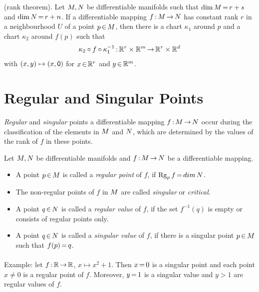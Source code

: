 \documentclass[11pt,twoside]{article}
\begin{document}
\begin{theorem} (rank theorem).
Let ${M},{N}$ be differentiable manifolds
such that
$\operatorname{dim} {M} {\,=\,} r+s$ and
$\operatorname{dim} {N} {\,=\,} r+n$.
If a differentiable mapping $f{\,:\,} {M} {\,\to\,} {N}$ has constant rank $r$
in a neighbourhood $U$ of a point $p {\,\in\,} {M}$,
then there is a chart $\kappa_1$ around $p$
and a chart $\kappa_2$ around $f(p)$
such that
\[
\kappa_2 \circ f \circ \kappa_1^{-1} {\,:\,}
{\mathbb{R}}^r \times {\mathbb{R}}^m {\,\to\,} {\mathbb{R}}^r \times {\mathbb{R}}^d
\]
with $(x,y) \mapsto (x,{\mathsf{0}})$ for $x {\,\in\,} {\mathbb{R}}^r$ and $y {\,\in\,} {\mathbb{R}}^m$.
\end{theorem}

\section{Regular and Singular Points}
\textit{Regular} and \textit{singular} points
{\wrt} a differentiable mapping $f{\,:\,} {M} {\,\to\,} {N}$
occur during the classification of the elements in ${M}$ and ${N}$,
which are determined by the values of the rank of $f$ in these points.

\begin{definition}
Let ${M},{N}$ be differentiable manifolds
and $f{\,:\,} {M} {\,\to\,} {N}$ be a differentiable mapping.
\begin{itemize}[leftmargin=15pt]
\item[1.]
A point $p {\,\in\,} {M}$ is called a \textit{regular point} of $f$,
if $\operatorname{Rg}_p f {\,=\,} dim \, {N}$.

\item[2.]
The non-regular points of $f$ in ${M}$ are called \textit{singular}
or \textit{critical}.

\item[3.]
A point $q {\,\in\,} {N}$ is called a \textit{regular value} of $f$,
if the set $f^{-1}(q)$ is empty or consists of regular points only.

\item[4.]
A point $q {\,\in\,} {N}$ is called a \textit{singular value} of $f$,
if there is a singular point $p {\,\in\,} {M}$ such that $f(p) {\,=\,} q$.
\end{itemize}
\end{definition}

\paragraph{}
Example:
let $f{\,:\,} {\mathbb{R}} {\,\to\,} {\mathbb{R}}$, $x \mapsto x^2{+}1$.
Then $x {\,=\,} 0$ is a singular point and each point $x \neq 0$
is a regular point of $f$.
Moreover,
$y {\,=\,} 1$ is a singular value and $y > 1$ are regular values of $f$.
\end{document}
